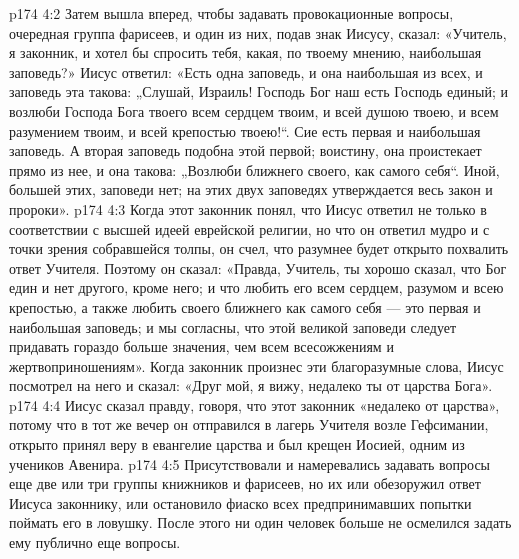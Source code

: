 \vs p174 4:2 Затем вышла вперед, чтобы задавать провокационные вопросы, очередная группа фарисеев, и один из них, подав знак Иисусу, сказал: «Учитель, я законник, и хотел бы спросить тебя, какая, по твоему мнению, наибольшая заповедь?» Иисус ответил: «Есть одна заповедь, и она наибольшая из всех, и заповедь эта такова: „Слушай, Израиль! Господь Бог наш есть Господь единый; и возлюби Господа Бога твоего всем сердцем твоим, и всей душою твоею, и всем разумением твоим, и всей крепостью твоею!“. Сие есть первая и наибольшая заповедь. А вторая заповедь подобна этой первой; воистину, она проистекает прямо из нее, и она такова: „Возлюби ближнего своего, как самого себя“. Иной, большей этих, заповеди нет; на этих двух заповедях утверждается весь закон и пророки».
\vs p174 4:3 Когда этот законник понял, что Иисус ответил не только в соответствии с высшей идеей еврейской религии, но что он ответил мудро и с точки зрения собравшейся толпы, он счел, что разумнее будет открыто похвалить ответ Учителя. Поэтому он сказал: «Правда, Учитель, ты хорошо сказал, что Бог един и нет другого, кроме него; и что любить его всем сердцем, разумом и всею крепостью, а также любить своего ближнего как самого себя --- это первая и наибольшая заповедь; и мы согласны, что этой великой заповеди следует придавать гораздо больше значения, чем всем всесожжениям и жертвоприношениям». Когда законник произнес эти благоразумные слова, Иисус посмотрел на него и сказал: «Друг мой, я вижу, недалеко ты от царства Бога».
\vs p174 4:4 \pc Иисус сказал правду, говоря, что этот законник «недалеко от царства», потому что в тот же вечер он отправился в лагерь Учителя возле Гефсимании, открыто принял веру в евангелие царства и был крещен Иосией, одним из учеников Авенира.
\vs p174 4:5 \pc Присутствовали и намеревались задавать вопросы еще две или три группы книжников и фарисеев, но их или обезоружил ответ Иисуса законнику, или остановило фиаско всех предпринимавших попытки поймать его в ловушку. После этого ни один человек больше не осмелился задать ему публично еще вопросы.
